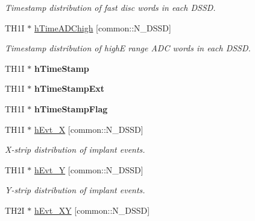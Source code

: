 \begin{DoxyCompactItemize}
\begin{DoxyCompactList}\small\item\em Timestamp distribution of fast disc words in each D\-S\-S\-D. \end{DoxyCompactList}\item 
\hypertarget{classAnalysis_a6e140e4363045a4fa77c81a0a15be313}{T\-H1\-I $\ast$ \hyperlink{classAnalysis_a6e140e4363045a4fa77c81a0a15be313}{h\-Time\-A\-D\-Chigh} \mbox{[}common\-::\-N\-\_\-\-D\-S\-S\-D\mbox{]}}\label{classAnalysis_a6e140e4363045a4fa77c81a0a15be313}

\begin{DoxyCompactList}\small\item\em Timestamp distribution of high\-E range A\-D\-C words in each D\-S\-S\-D. \end{DoxyCompactList}\item 
\hypertarget{classAnalysis_aa5295d5e2440458b262a42244852920f}{T\-H1\-I $\ast$ {\bfseries h\-Time\-Stamp}}\label{classAnalysis_aa5295d5e2440458b262a42244852920f}

\item 
\hypertarget{classAnalysis_a5e05f03f4411f645a8350c84f0c9d2b6}{T\-H1\-I $\ast$ {\bfseries h\-Time\-Stamp\-Ext}}\label{classAnalysis_a5e05f03f4411f645a8350c84f0c9d2b6}

\item 
\hypertarget{classAnalysis_ac2478a1eb858b5f132a306c94a8b9d23}{T\-H1\-I $\ast$ {\bfseries h\-Time\-Stamp\-Flag}}\label{classAnalysis_ac2478a1eb858b5f132a306c94a8b9d23}

\item 
\hypertarget{classAnalysis_aaaafd0bd81ba83f5357f983a433dfb1c}{T\-H1\-I $\ast$ \hyperlink{classAnalysis_aaaafd0bd81ba83f5357f983a433dfb1c}{h\-Evt\-\_\-\-X} \mbox{[}common\-::\-N\-\_\-\-D\-S\-S\-D\mbox{]}}\label{classAnalysis_aaaafd0bd81ba83f5357f983a433dfb1c}

\begin{DoxyCompactList}\small\item\em X-\/strip distribution of implant events. \end{DoxyCompactList}\item 
\hypertarget{classAnalysis_a74592ad2cb41124c827c23981524078c}{T\-H1\-I $\ast$ \hyperlink{classAnalysis_a74592ad2cb41124c827c23981524078c}{h\-Evt\-\_\-\-Y} \mbox{[}common\-::\-N\-\_\-\-D\-S\-S\-D\mbox{]}}\label{classAnalysis_a74592ad2cb41124c827c23981524078c}

\begin{DoxyCompactList}\small\item\em Y-\/strip distribution of implant events. \end{DoxyCompactList}\item 
\hypertarget{classAnalysis_a25f806cefcee2d329ef28b3b9cec5cb8}{T\-H2\-I $\ast$ \hyperlink{classAnalysis_a25f806cefcee2d329ef28b3b9cec5cb8}{h\-Evt\-\_\-\-X\-Y} \mbox{[}common\-::\-N\-\_\-\-D\-S\-S\-D\mbox{]}}\label{classAnalysis_a25f806cefcee2d329ef28b3b9cec5cb8}


\end{DoxyCompactItemize}
